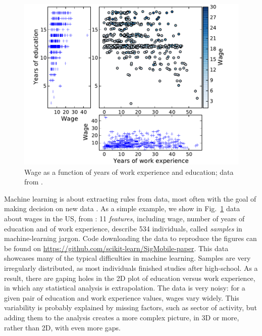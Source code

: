 \documentclass[a4paper]{article}
\begin{document}
\begin{figure}[b]
    \includegraphics[width=1.05\linewidth]{wage_data}%

    \caption{Wage as a function of years of work experience and
    education; data from \cite{berndt1991}\label{fig:data}.}
\end{figure}

Machine learning is about extracting rules from data, most often with the
goal of making decision on new data \cite{elemstatlearn}. As a simple example, we show in
Fig.~\ref{fig:data} data about wages in the US, from \cite{berndt1991}:
11 \emph{features}, including wage, number of years of education and of work
experience, describe 534 individuals,
called \emph{samples} in machine-learning jargon.
Code downloading the data to reproduce the figures can be found on
\url{https://github.com/scikit-learn/SigMobile-paper}.
%
This data showcases many of the typical difficulties in machine learning.
Samples are very irregularly distributed, as most individuals
finished studies after high-school. As a result, there are gaping
holes in the 2D plot of education versus work experience, in which any
statistical analysis is extrapolation. The data is very noisy: for a
given pair of education and work experience values, wages vary widely.
This variability
is probably explained by missing factors, such as sector of
activity, but adding them to the analysis creates a more complex picture,
in 3D or more, rather than 2D, with even more gaps.
\end{document}
